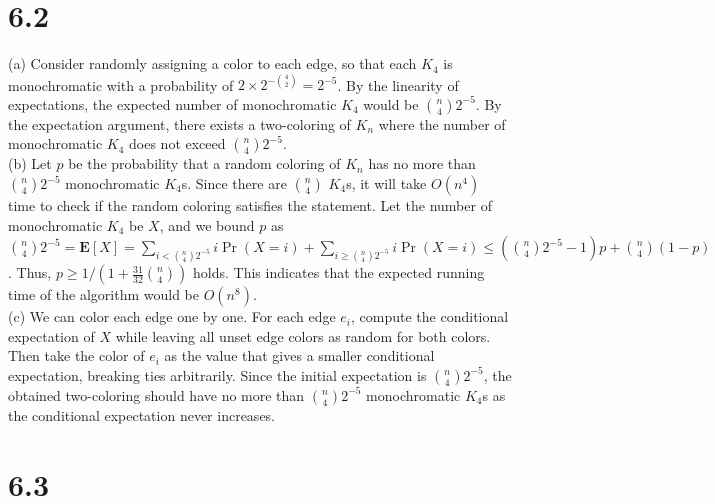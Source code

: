 \documentclass{article}
\begin{document}
\section*{6.2}
(a) Consider randomly assigning a color to each edge, so that each $K_4$ is monochromatic with a probability of $2\times2^{-\binom{4}{2}}=2^{-5}$.
By the linearity of expectations, the expected number of monochromatic $K_4$ would be $\binom{n}{4}2^{-5}$.
By the expectation argument, there exists a two-coloring of $K_n$ where the number of monochromatic $K_4$ does not exceed $\binom{n}{4}2^{-5}$.\\
(b) Let $p$ be the probability that a random coloring of $K_n$ has no more than $\binom{n}{4}2^{-5}$ monochromatic $K_4$s.
Since there are $\binom{n}{4}$ $K_4$s, it will take $O(n^4)$ time to check if the random coloring satisfies the statement.
Let the number of monochromatic $K_4$ be $X$, and we bound $p$ as $\binom{n}{4}2^{-5}=\textbf{E}[X]=\sum\limits_{i<\binom{n}{4}2^{-5}}i\Pr(X=i)+\sum\limits_{i\geq\binom{n}{4}2^{-5}}i\Pr(X=i)\leq \left(\binom{n}{4}2^{-5}-1\right)p+\binom{n}{4}(1-p)$.
Thus, $p \geq 1/(1+\frac{31}{32}\binom{n}{4})$ holds.
This indicates that the expected running time of the algorithm would be $O(n^8)$.\\
(c) We can color each edge one by one.
For each edge $e_i$, compute the conditional expectation of $X$ while leaving all unset edge colors as random for both colors.
Then take the color of $e_i$ as the value that gives a smaller conditional expectation, breaking ties arbitrarily.
Since the initial expectation is $\binom{n}{4}2^{-5}$, the obtained two-coloring should have no more than $\binom{n}{4}2^{-5}$ monochromatic $K_4$s as the conditional expectation never increases.
\section*{6.3}
\end{document}
